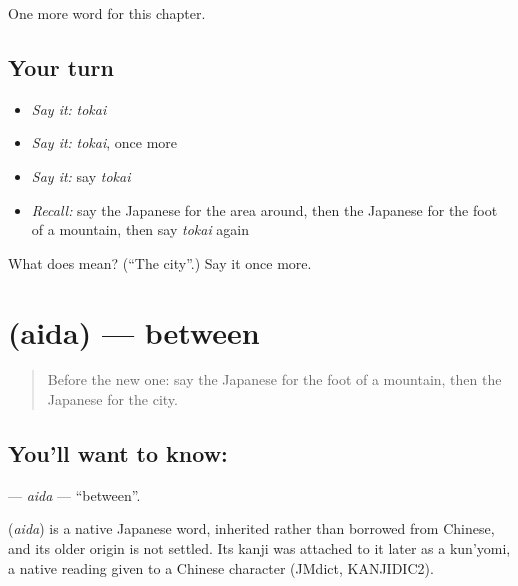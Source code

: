 \begin{grammarlens}[title={What you've built}]
One more word for this chapter.
\end{grammarlens}

\subsection*{Your turn}
\begin{itemize}
\raggedright
  \item \emph{Say it:} \emph{tokai}
  \item \emph{Say it:} \emph{tokai}, once more
  \item \emph{Say it:} say \emph{tokai}
  \item \emph{Recall:} say the Japanese for the area around, then the Japanese for the foot of a mountain, then say \emph{tokai} again
\end{itemize}

\begin{tcolorbox}[breakable,colback=teal!4,colframe=teal!35!black,title={Before you move on}]
What does  mean? (\textquotedblleft{}The city\textquotedblright{}.) Say it once more.
\end{tcolorbox}
\section[\texorpdfstring{\ja{あいだ} (aida)}{あいだ (aida)}]{ (aida) — between}

\label{lesson:JA-C81-aida}



\begin{quote}
Before the new one: say the Japanese for the foot of a mountain, then the Japanese for the city.
\end{quote}

\subsection*{You'll want to know: }
\textbf{} — \emph{aida} — \textquotedblleft{}between\textquotedblright{}.

\begin{cousinweb}
\textbf{} (\emph{aida}) is a native Japanese word, inherited rather than borrowed from Chinese, and its older origin is not settled. Its kanji was attached to it later as a kun'yomi, a native reading given to a Chinese character (JMdict, KANJIDIC2).
\end{cousinweb}

